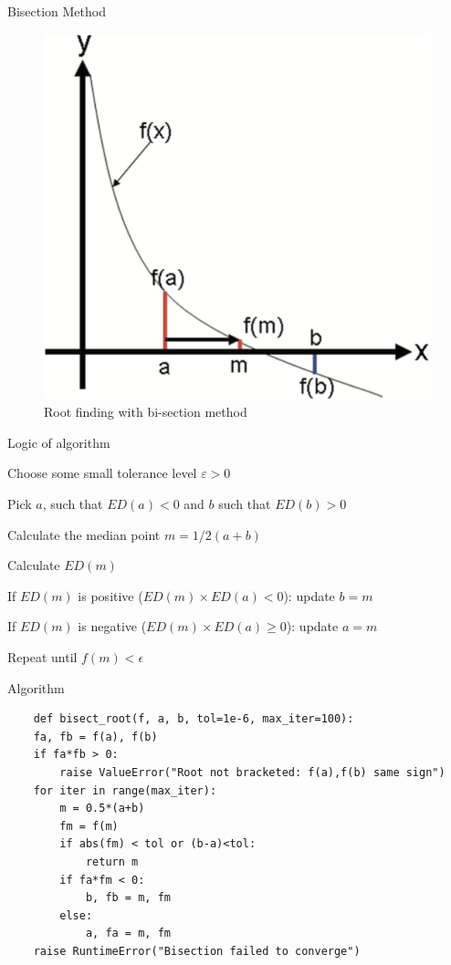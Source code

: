 \documentclass[notes,11pt, aspectratio=169, xcolor=table]{beamer}
\newenvironment{wideitemize}{\itemize\addtolength{\itemsep}{10pt}}{\enditemize}
\begin{document}
\begin{frame}{Bisection Method}
\begin{figure}
    \centering
    \includegraphics[width=0.5\linewidth]{figs/bisection-method.png}
    \caption{Root finding with bi-section method}
    \label{fig:ed}
\end{figure}
\end{frame}

\begin{frame}{Logic of algorithm}

\begin{wideitemize}
    \item Choose some small tolerance level $\varepsilon>0$ 
    
    \item Pick $a$, such that $ED(a) <0$ and $b$ such that $ED(b)>0$

    \item Calculate the median point $m = 1/2(a+b)$

    \item Calculate $ED(m)$

    \item If $ED(m)$ is positive ($ED(m)\times ED(a) <0$): update $b=m$

    \item If $ED(m)$ is negative ($ED(m)\times ED(a) \ge 0$): update $a=m$

    \item Repeat until $f(m) < \epsilon$

\end{wideitemize}
    
\end{frame}

\begin{frame}[fragile=singleslide]{Algorithm}

\begin{verbatim}
    def bisect_root(f, a, b, tol=1e-6, max_iter=100):
    fa, fb = f(a), f(b)
    if fa*fb > 0:
        raise ValueError("Root not bracketed: f(a),f(b) same sign")
    for iter in range(max_iter):
        m = 0.5*(a+b)
        fm = f(m)
        if abs(fm) < tol or (b-a)<tol:
            return m
        if fa*fm < 0:
            b, fb = m, fm
        else:
            a, fa = m, fm
    raise RuntimeError("Bisection failed to converge")
\end{verbatim}

\end{frame}
\end{document}
